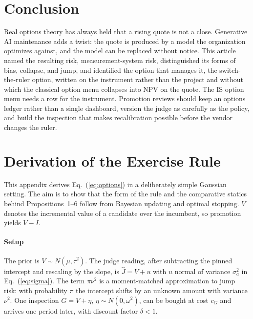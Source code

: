 \documentclass[acmsmall,screen,review]{acmart}
\theoremstyle{acmdefinition}
\begin{document}
\section{Conclusion}\label{sec:conclusion}

Real options theory has always held that a rising quote is not a close. Generative AI maintenance adds a twist: the quote is produced by a model the organization optimizes against, and the model can be replaced without notice. This article named the resulting risk, measurement-system risk, distinguished its forms of bias, collapse, and jump, and identified the option that manages it, the switch-the-ruler option, written on the instrument rather than the project and without which the classical option menu collapses into NPV on the quote. The IS option menu needs a row for the instrument. Promotion reviews should keep an options ledger rather than a single dashboard, version the judge as carefully as the policy, and build the inspection that makes recalibration possible before the vendor changes the ruler.




\appendix

\section{Derivation of the Exercise Rule}\label{app:rule}

This appendix derives Eq.~(\ref{eq:options}) in a deliberately simple Gaussian setting. The aim is to show that the form of the rule and the comparative statics behind Propositions~1--6 follow from Bayesian updating and optimal stopping. $V$ denotes the incremental value of a candidate over the incumbent, so promotion yields $V - I$.

\paragraph{Setup} The prior is $V \sim N(\mu,\tau^2)$. The judge reading, after subtracting the pinned intercept and rescaling by the slope, is $\hat{J} = V + u$ with $u$ normal of variance $\sigma_a^2$ in Eq.~(\ref{eq:sigma}). The term $\pi\nu^2$ is a moment-matched approximation to jump risk: with probability $\pi$ the intercept shifts by an unknown amount with variance $\nu^2$. One inspection $G = V + \eta$, $\eta \sim N(0,\omega^2)$, can be bought at cost $c_G$ and arrives one period later, with discount factor $\delta < 1$.
\end{document}
